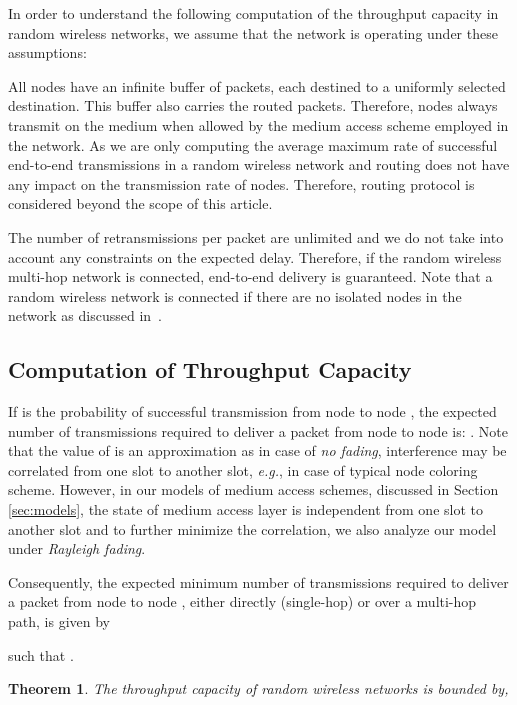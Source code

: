 \documentclass[12pt,english]{article}
\newtheorem{theorem}{Theorem}[section]
\begin{document}
In order to understand the following computation of the throughput capacity in random wireless networks, we assume that the network is operating under these assumptions:
\begin{compactenum}[-]
\item All nodes have an infinite buffer of packets, each destined to a uniformly selected destination. This buffer also carries the routed packets. Therefore, nodes always transmit on the medium when allowed by the medium access scheme employed in the network. As we are only computing the average maximum rate of successful end-to-end transmissions in a random wireless network and routing does not have any impact on the transmission rate of nodes. Therefore, routing protocol is considered beyond the scope of this article.
\item The number of retransmissions per packet are unlimited and we do not take into account any constraints on the expected delay. Therefore, if the random wireless multi-hop network is connected, end-to-end delivery is guaranteed. Note that a random wireless network is connected if there are no isolated nodes in the network as discussed in~\cite{Gupta:Kumar}.
\end{compactenum}

\subsection{Computation of Throughput Capacity}

If  is the probability of successful transmission from node  to node , the expected number of transmissions required to deliver a packet from node  to node  is: \mbox{}. Note that the value of  is an approximation as in case of {\em no fading}, interference may be correlated from one slot to another slot, {\it e.g.}, in case of typical node coloring scheme. However, in our models of medium access schemes, discussed in Section \ref{sec:models}, the state of medium access layer is independent from one slot to another slot and to further minimize the correlation, we also analyze our model under {\em Rayleigh fading}. 

Consequently, the expected minimum number of transmissions required to deliver a packet from node  to node , either directly (single-hop) or over a multi-hop path, is given by

such that \mbox{}. 

\begin{theorem}
The throughput capacity of random wireless networks is bounded by,

\end{theorem}
\end{document}
